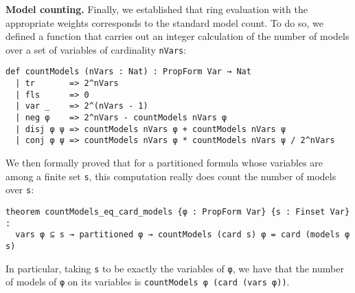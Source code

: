 \vspace{1em}\noindent
\textbf{Model counting.} Finally, we established that ring evaluation with the appropriate weights
corresponds to the standard model count. To do so, we defined a function that
carries out an integer calculation of the number of models over a set of variables
of cardinality \lstinline{nVars}:
\begin{lstlisting}
def countModels (nVars : Nat) : PropForm Var → Nat
  | tr       => 2^nVars
  | fls      => 0
  | var _    => 2^(nVars - 1)
  | neg φ    => 2^nVars - countModels nVars φ
  | disj φ ψ => countModels nVars φ + countModels nVars ψ
  | conj φ ψ => countModels nVars φ * countModels nVars ψ / 2^nVars
\end{lstlisting}
We then formally proved that for a partitioned formula whose variables are among a finite set
\lstinline{s}, this computation really does count the number of models over \lstinline{s}:
\begin{lstlisting}
theorem countModels_eq_card_models {φ : PropForm Var} {s : Finset Var} :
  vars φ ⊆ s → partitioned φ → countModels (card s) φ = card (models φ s)
\end{lstlisting}
In particular, taking \lstinline{s} to be exactly the variables of \lstinline{φ},
we have that the number of models of \lstinline{φ} on its variables is
\lstinline{countModels φ (card (vars φ))}.
